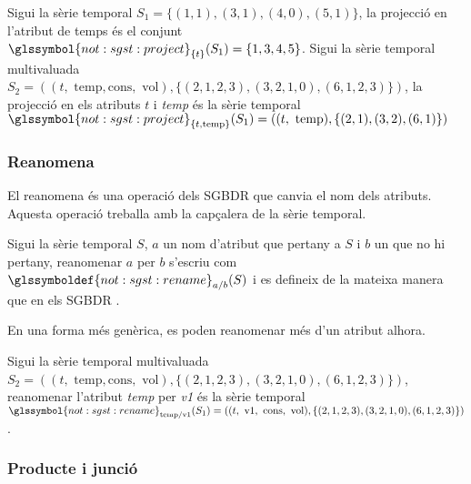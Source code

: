 \begin{example}
  Sigui la sèrie temporal $S_1=\{(1,1),(3,1),(4,0),(5,1)\}$, la
  projecció en l'atribut de temps és el conjunt
  $\glssymbol{not:sgst:project}_{\{t\}}(S_1) = \{ 1,3,4,5 \}$.  Sigui
  la sèrie temporal multivaluada $S_2 = ( (t,\text{ temp},\text{
    cons},\text{ vol}),\{ (2,1,2,3), (3,2,1,0), (6,1,2,3) \})$, la
  projecció en els atributs $t$ i \emph{temp} és la sèrie temporal
  $\glssymbol{not:sgst:project}_{ \{t,\text{temp}\}}(S_1) = (
  (t,\text{ temp}),\{ (2,1), (3,2), (6,1) \})$
\end{example}







\subsubsection{Reanomena}

El reanomena és una operació dels \gls{SGBDR} que canvia el nom dels
atributs.  Aquesta operació treballa amb la
capçalera de la sèrie temporal.


\begin{definition}[Reanomena]
  Sigui la sèrie temporal $S$, $a$ un nom
  d'atribut que pertany a $S$ i $b$ un que no hi pertany, reanomenar
  $a$ per $b$ s'escriu com $\glssymboldef{not:sgst:rename}_{a/b} (S)$
  i es defineix de la mateixa manera que en els
  \gls{SGBDR} \parencite[cap.~7]{date04:introduction8}.
\end{definition}

En una forma més genèrica, es poden reanomenar més d'un atribut
alhora.

\begin{example}
  Sigui la sèrie temporal multivaluada $S_2 = ( (t,\text{ temp},\text{
    cons},\text{ vol}),\{ (2,1,2,3), (3,2,1,0), (6,1,2,3) \})$, reanomenar 
  l'atribut \emph{temp} per \emph{v1} és la sèrie temporal
  $\glssymbol{not:sgst:rename}_{\text{temp}/\text{v1}}(S_1) = ( (t,\text{ v1},\text{
    cons},\text{ vol}),\{ (2,1,2,3), (3,2,1,0), (6,1,2,3) \})$.
\end{example}



\subsubsection{Producte i junció}

